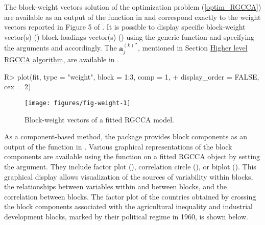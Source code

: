 \documentclass[
]{jss}
\begin{document}
\normalsize

The block-weight vectors solution of the optimization problem
(\ref{optim_RGCCA}) are available as an output of the 
function in  and correspond exactly to the weight vectors
reported in Figure 5 of \cite{Tenenhaus2011}. It is possible to display
specific block-weight vector(s) () block-loadings
vector(s) () using the generic 
function and specifying the arguments  and 
accordingly. The \({ \mathbf a_j^{(k)}}^\star\), mentioned in Section
\protect\hyperlink{higher-level-rgcca-algorithm}{Higher level RGCCA
algorithm}, are available in .

\footnotesize

\begin{CodeChunk}
\begin{CodeInput}
R> plot(fit, type = "weight", block = 1:3, comp = 1,
+      display_order = FALSE, cex = 2)
\end{CodeInput}
\begin{figure}[H]

{\centering \texttt{[image: figures/fig-weight-1]} 

}

\caption[Block-weight vectors of a fitted RGCCA model]{Block-weight vectors of a fitted RGCCA model.}\label{fig:fig-weight}
\end{figure}
\end{CodeChunk}

\normalsize

As a component-based method, the  package provides block
components as an output of the  function in .
Various graphical representations of the block components are available
using the  function on a fitted RGCCA object by setting the
 argument. They include factor plot (),
correlation circle (), or biplot ().
This graphical display allows visualization of the sources of
variability within blocks, the relationships between variables within
and between blocks, and the correlation between blocks. The factor plot
of the countries obtained by crossing the block components associated
with the agricultural inequality and industrial development blocks,
marked by their political regime in 1960, is shown below.

\footnotesize
\end{document}
